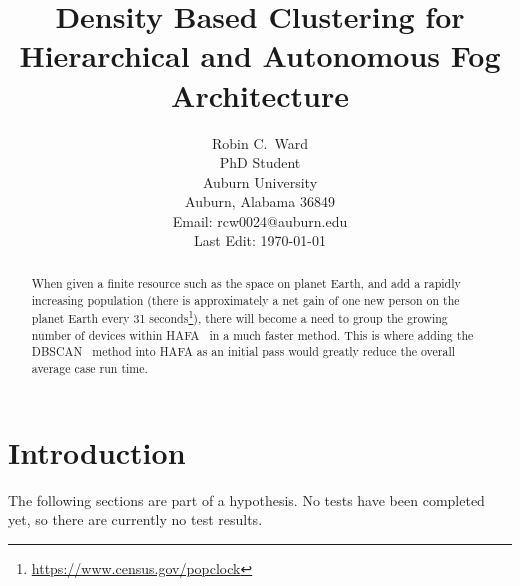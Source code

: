 \documentclass[letterpaper,twocolumn,10pt]{article}
\begin{document}



\title{\Large \bf Density Based Clustering for Hierarchical and Autonomous Fog Architecture}


\author{
{\rm Robin C.\ Ward}\\
PhD Student\\
Auburn University\\
Auburn, Alabama 36849\\
Email: rcw0024@auburn.edu\\
Last Edit: \today
} %

\maketitle

\begin{abstract}
When given a finite resource such as the space on planet Earth, and add a rapidly increasing population (there is approximately a net gain of one new person on the planet Earth every 31 seconds\footnote{\url{https://www.census.gov/popclock}}), there will become a need to group the growing number of devices within HAFA~\cite{10.1145/3229710.3229740} in a much faster method. This is where adding the DBSCAN~\cite{10.5555/3001460.3001507} method into HAFA as an initial pass would greatly reduce the overall average case run time.

\end{abstract}


\section{Introduction}

The following sections are part of a hypothesis. No tests have been completed yet, so there are currently no test results.
\end{document}
